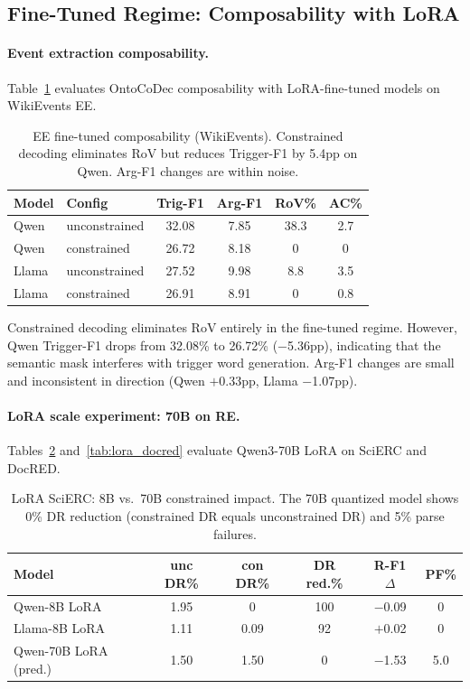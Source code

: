 \documentclass[11pt]{article}
\newcommand{\sys}{OntoCoDec}
\begin{document}
\subsection{Fine-Tuned Regime: Composability with LoRA}
\label{sec:ft}

\paragraph{Event extraction composability.}
Table~\ref{tab:ee_ft} evaluates \sys{} composability with LoRA-fine-tuned models on WikiEvents EE.

\begin{table}[t]
\centering
\small
\caption{EE fine-tuned composability (WikiEvents). Constrained decoding eliminates RoV but reduces Trigger-F1 by 5.4pp on Qwen. Arg-F1 changes are within noise.}
\label{tab:ee_ft}
\begin{tabular}{llcccc}
\toprule
\textbf{Model} & \textbf{Config} & \textbf{Trig-F1} & \textbf{Arg-F1} & \textbf{RoV\%} & \textbf{AC\%} \\
\midrule
Qwen  & unconstrained & 32.08 & 7.85 & 38.3 & 2.7 \\
Qwen  & constrained   & 26.72 & 8.18 & 0    & 0   \\
Llama & unconstrained & 27.52 & 9.98 & 8.8  & 3.5 \\
Llama & constrained   & 26.91 & 8.91 & 0    & 0.8 \\
\bottomrule
\end{tabular}
\end{table}

Constrained decoding eliminates RoV entirely in the fine-tuned regime.
However, Qwen Trigger-F1 drops from 32.08\% to 26.72\% ($-$5.36pp), indicating that the semantic mask interferes with trigger word generation.
Arg-F1 changes are small and inconsistent in direction (Qwen $+$0.33pp, Llama $-$1.07pp).

\paragraph{LoRA scale experiment: 70B on RE.}
Tables~\ref{tab:lora_scierc} and~\ref{tab:lora_docred} evaluate Qwen3-70B LoRA on SciERC and DocRED.

\begin{table}[t]
\centering
\small
\caption{LoRA SciERC: 8B vs.\ 70B constrained impact. The 70B quantized model shows 0\% DR reduction (constrained DR equals unconstrained DR) and 5\% parse failures.}
\label{tab:lora_scierc}
\begin{tabular}{lccccc}
\toprule
\textbf{Model} & \textbf{unc DR\%} & \textbf{con DR\%} & \textbf{DR red.\%} & \textbf{R-F1 $\Delta$} & \textbf{PF\%} \\
\midrule
Qwen-8B LoRA          & 1.95 & 0    & 100 & $-$0.09 & 0   \\
Llama-8B LoRA         & 1.11 & 0.09 & 92  & $+$0.02 & 0   \\
Qwen-70B LoRA (pred.) & 1.50 & 1.50 & 0   & $-$1.53 & 5.0 \\
\bottomrule
\end{tabular}
\end{table}
\end{document}
